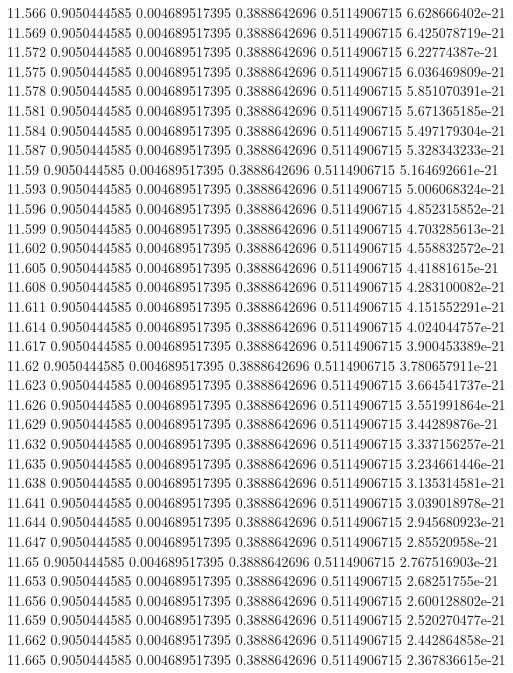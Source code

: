 {11.566 0.9050444585 0.004689517395 0.3888642696 0.5114906715 6.628666402e-21
11.569 0.9050444585 0.004689517395 0.3888642696 0.5114906715 6.425078719e-21
11.572 0.9050444585 0.004689517395 0.3888642696 0.5114906715 6.22774387e-21
11.575 0.9050444585 0.004689517395 0.3888642696 0.5114906715 6.036469809e-21
11.578 0.9050444585 0.004689517395 0.3888642696 0.5114906715 5.851070391e-21
11.581 0.9050444585 0.004689517395 0.3888642696 0.5114906715 5.671365185e-21
11.584 0.9050444585 0.004689517395 0.3888642696 0.5114906715 5.497179304e-21
11.587 0.9050444585 0.004689517395 0.3888642696 0.5114906715 5.328343233e-21
11.59 0.9050444585 0.004689517395 0.3888642696 0.5114906715 5.164692661e-21
11.593 0.9050444585 0.004689517395 0.3888642696 0.5114906715 5.006068324e-21
11.596 0.9050444585 0.004689517395 0.3888642696 0.5114906715 4.852315852e-21
11.599 0.9050444585 0.004689517395 0.3888642696 0.5114906715 4.703285613e-21
11.602 0.9050444585 0.004689517395 0.3888642696 0.5114906715 4.558832572e-21
11.605 0.9050444585 0.004689517395 0.3888642696 0.5114906715 4.41881615e-21
11.608 0.9050444585 0.004689517395 0.3888642696 0.5114906715 4.283100082e-21
11.611 0.9050444585 0.004689517395 0.3888642696 0.5114906715 4.151552291e-21
11.614 0.9050444585 0.004689517395 0.3888642696 0.5114906715 4.024044757e-21
11.617 0.9050444585 0.004689517395 0.3888642696 0.5114906715 3.900453389e-21
11.62 0.9050444585 0.004689517395 0.3888642696 0.5114906715 3.780657911e-21
11.623 0.9050444585 0.004689517395 0.3888642696 0.5114906715 3.664541737e-21
11.626 0.9050444585 0.004689517395 0.3888642696 0.5114906715 3.551991864e-21
11.629 0.9050444585 0.004689517395 0.3888642696 0.5114906715 3.44289876e-21
11.632 0.9050444585 0.004689517395 0.3888642696 0.5114906715 3.337156257e-21
11.635 0.9050444585 0.004689517395 0.3888642696 0.5114906715 3.234661446e-21
11.638 0.9050444585 0.004689517395 0.3888642696 0.5114906715 3.135314581e-21
11.641 0.9050444585 0.004689517395 0.3888642696 0.5114906715 3.039018978e-21
11.644 0.9050444585 0.004689517395 0.3888642696 0.5114906715 2.945680923e-21
11.647 0.9050444585 0.004689517395 0.3888642696 0.5114906715 2.85520958e-21
11.65 0.9050444585 0.004689517395 0.3888642696 0.5114906715 2.767516903e-21
11.653 0.9050444585 0.004689517395 0.3888642696 0.5114906715 2.68251755e-21
11.656 0.9050444585 0.004689517395 0.3888642696 0.5114906715 2.600128802e-21
11.659 0.9050444585 0.004689517395 0.3888642696 0.5114906715 2.520270477e-21
11.662 0.9050444585 0.004689517395 0.3888642696 0.5114906715 2.442864858e-21
11.665 0.9050444585 0.004689517395 0.3888642696 0.5114906715 2.367836615e-21
}
